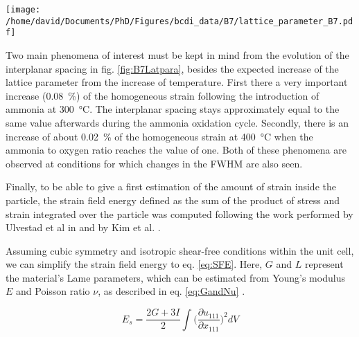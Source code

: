 \begin{SCfigure}
    \centering
    \texttt{[image: /home/david/Documents/PhD/Figures/bcdi\_data/B7/lattice\_parameter\_B7.pdf]}
    \caption{
        Evolution of the interplanar spacing $d_{111}$ and homogeneous strain $\epsilon_{111, homo}$ for particle B as a function of the ammonia to oxygen ratio.
        The reference for the computation of $\epsilon_{111, homo}$ was taken as the mean value at \qty{25}{\degreeCelsius}.
        The reproduction of measurements at fixed conditions yield multiple data points, lines at \qty{300}{\degreeCelsius} and \qty{400}{\degreeCelsius} link the data points in the order of the measurements.
    }
    \label{fig:B7Latpara}
\end{SCfigure}

Two main phenomena of interest must be kept in mind from the evolution of the interplanar spacing in fig. \ref{fig:B7Latpara}, besides the expected increase of the lattice parameter from the increase of temperature.
First there a very important increase (\qty{0.08}{\percent}) of the homogeneous strain following the introduction of ammonia at \qty{300}{\degreeCelsius}.
The interplanar spacing stays approximately equal to the same value afterwards during the ammonia oxidation cycle.
Secondly, there is an increase of about \qty{0.02}{\percent} of the homogeneous strain at \qty{400}{\degreeCelsius} when the ammonia to oxygen ratio reaches the value of one.
Both of these phenomena are observed at conditions for which changes in the FWHM are also seen.

Finally, to be able to give a first estimation of the amount of strain inside the particle, the strain field energy defined as the sum of the product of stress and strain integrated over the particle \parencite{Cahn1959} was computed following the work performed by Ulvestad et al in \cite*{Ulvestad2015a} and by Kim et al. \cite*{Kim2019}.

Assuming cubic symmetry and isotropic shear-free conditions within the unit cell, we can simplify the strain field energy to eq. \ref{eq:SFE}.
Here, $G$ and $L$ represent the material's Lame parameters, which can be estimated from Young's modulus $E$ and Poisson ratio $\nu$, as described in eq. \ref{eq:GandNu} \parencite{Mavko2020}.

\begin{equation}
    E_s = \frac{2G + 3I}{2} \int \Big( \frac{\partial u_{111}}{\partial x_{111}}\Big)^2 dV
    \label{eq:SFE}
\end{equation}

